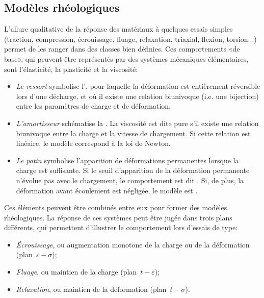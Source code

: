 
\medskip
\subsection{Modèles rhéologiques}

L'allure qualitative de la réponse des matériaux à quelques essais simples (traction, compression, écrouissage, fluage, relaxation, triaxial, flexion, torsion...) permet de les ranger dans des classes bien définies. Ces comportements «de base», qui peuvent être représentés par des systèmes mécaniques élémentaires, sont l'élasticité, la plasticité et la viscosité:
\begin{itemize}
  \item \emph{Le ressort} symbolise l', pour laquelle la déformation est entièrement réversible lors d'une décharge, et où il existe une relation biunivoque (i.e. une bijection) entre les paramètres de charge et de déformation.
  \item \emph{L'amortisseur} schématise la .
	La viscosité est dite pure s'il existe une relation biunivoque entre la charge et la vitesse de chargement. Si cette relation est linéaire, 	le modèle correspond à la loi de Newton. 
  \item \emph{Le patin} symbolise l'apparition de déformations permanentes lorsque la
	charge est suffisante.
	Si le seuil d'apparition de la déformation permanente n'évolue pas avec le chargement, le comportement est dit .
	Si, de plus, la déformation avant écoulement est négligée, le modèle est
	.
\end{itemize}
\medskipvm
Ces éléments peuvent être combinés entre eux pour former des modèles rhéologiques. La réponse de ces systèmes peut être jugée dans trois plans différents, qui permettent d'illustrer le comportement lors d'essais de type:
\begin{itemize}
  \item \emph{Écrouissage}, ou augmentation monotone de la charge ou de la déformation
	(plan~$\varepsilon-\sigma$);
  \item \emph{Fluage}, ou maintien de la charge (plan~$t-\varepsilon$);
  \item \emph{Relaxation}, ou maintien de la déformation (plan~$t-\sigma$).
\end{itemize}
